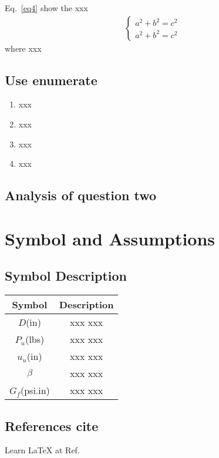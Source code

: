 \documentclass{swmcmthesis}
\begin{document}
Eq.~\eqref{eq4} show the xxx
\begin{align}
\label{eq4}
\begin{cases}
a^2+b^2=c^2\\
a^2+b^2=c^2
\end{cases}
\end{align}
where xxx

\subsection{Use enumerate}

\begin{enumerate}
\item xxx
\item xxx
\item xxx
\item xxx
\end{enumerate}

\subsection{Analysis of question two}
\lipsum[1-2]

\section{Symbol and Assumptions}
\lipsum[1-2]

\subsection{Symbol Description}

\begin{table}[!h]
\centering
\begin{tabular}{cc}
\toprule[1.5pt]
Symbol & Description\\
\midrule[1pt]
$D$(in)  & xxx xxx\\
$P_u$(lbs)  & xxx xxx\\
$u_u$(in)  & xxx xxx\\
$\beta$  & xxx xxx\\
$G_f$(psi.in) & xxx xxx\\
\bottomrule[1.5pt]
\end{tabular}
\end{table}

\subsection{References cite}
Learn \LaTeX{} at Ref.\cite{bib:one}
\end{document}
